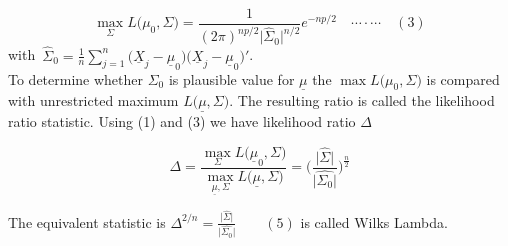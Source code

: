\documentclass[11pt,a4paper]{article}
\theoremstyle{definition}
\begin{document}
$$\max\limits_{\Sigma}L\big(\mu_0,\Sigma\big) = \frac{1}{(2\pi)^{np/2}\big|\widehat{\Sigma}_0\big|^{n/2}}e^{-np/2}\quad \cdots\cdot\cdots\quad  (3)$$
with\, $\displaystyle{\widehat{\Sigma}_0=\frac{1}{n}\sum^n_{j=1}\big(\underline{X}_j-\underline{\mu}_0\big)\big(\underline{X}_j-\underline{\mu}_0\big)'}$.\\

To determine whether $\Sigma_0$ is plausible value for $\underline{\mu}$ the $\max L\big(\mu_0,\Sigma\big)$ is compared with unrestricted maximum $L\big(\underline{\mu},\Sigma\big)$. The resulting ratio is called the likelihood ratio statistic. Using (1) and (3) we have likelihood ratio $\Delta$



\begin{equation}\tag{4}
\Delta = \frac{\max\limits_{\Sigma}L\big(\underline{\mu}_0,\Sigma\big)}{\max\limits_{\underline{\mu},\Sigma}L\big(\underline{\mu},\Sigma\big)}=\Bigg(\frac{\big|\hat{\Sigma}\big|}{\big|\hat{\Sigma_0}\big|}\Bigg)^{\frac{n}{2}}
\end{equation}


The equivalent statistic is $\Delta^{2/n} = \frac{\big|\widehat{\Sigma}\big|}{\big|\widehat{\Sigma_0}\big|}\qquad (5)$ is called Wilks Lambda.\\\\\\\\
\end{document}
